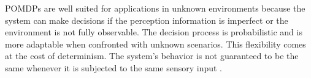 POMDPs are well suited for applications in unknown environments because the system can make decisions if the perception information is imperfect or the environment is not fully observable. The decision process is probabilistic and is more adaptable when confronted with unknown scenarios. This flexibility comes at the cost of determinism. The system's behavior is not guaranteed to be the same whenever it is subjected to the same sensory input \cite{krishnamurthy2016partially}.

